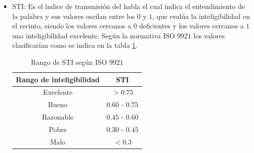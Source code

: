 \begin{itemize}
    
    \item STI: Es el índice de transmisión del habla el cual indica el entendimiento de la palabra y sus valores oscilan entre los $0$ y $1$, que evalúa la inteligibilidad en el recinto, siendo los valores cercanos a 0 deficientes y los valores cercanos a $1$ una inteligibilidad excelente. Según la normativa ISO $9921$ \cite{ISO9921} los valores clasificarían como se indica en la tabla \ref{tab: rango STI}. 

\begin{table}[H]
    \centering
    \caption{Rango de STI según ISO $9921$}
    \label{tab: rango STI}
    \begin{tabular}{|c|c|}
    \hline
    \textbf{Rango de inteligibilidad} & \textbf{STI} \\ \hline
    Excelente                &     $>0.75$     \\ \hline
    Bueno                    & $0.60$ - $0.75$ \\ \hline
    Razonable                & $0.45$ - $0.60$ \\ \hline
    Pobre                    & $0.30$ - $0.45$ \\ \hline
    Malo                     & $<0.3$ \\ \hline
    \end{tabular}
\end{table}
\end{itemize}


